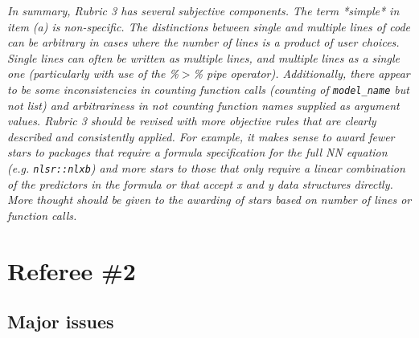 \documentclass[12pt]{article}
\newcommand{\code}{\texttt}
\begin{document}
\begin{enumerate}
\textit{
In summary, Rubric 3 has several subjective components.  The term *simple* in item (a) is non-specific.  
The distinctions between single and multiple lines of code can be arbitrary in cases where the number of lines is a product of user choices.  
Single lines can often be written as multiple lines, and multiple lines as a single one (particularly with use of the \%$>$\% pipe operator).  
Additionally, there appear to be some inconsistencies in counting function calls (counting of \code{model\_name}  but not list) 
and arbitrariness in not counting function names supplied as argument values. 
Rubric 3 should be revised with more objective rules that are clearly described and consistently applied.  
For example, it makes sense to award fewer stars to packages that require a formula specification for the full NN equation 
(e.g. \code{nlsr::nlxb}) and more stars to those that only require a linear combination of the predictors in the formula or that 
accept x and y data structures directly.  
More thought should be given to the awarding of stars based on number of lines or function calls.
}

\textbf{}



\end{enumerate}

\newpage
\section{Referee \#2}\label{referee2}

\subsection*{Major issues}
\end{document}
